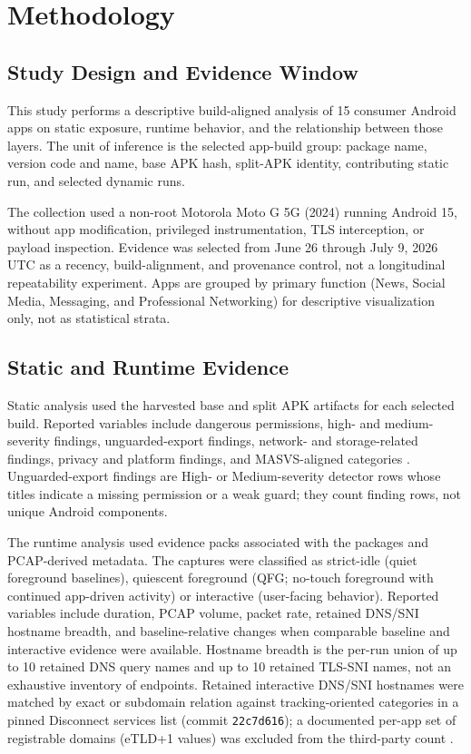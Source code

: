 \section{Methodology}

\subsection{Study Design and Evidence Window}

This study performs a descriptive build-aligned analysis of 15 consumer Android apps on static exposure, runtime behavior, and the relationship between those layers. The unit of inference is the selected app-build group: package name, version code and name, base APK hash, split-APK identity, contributing static run, and selected dynamic runs.

The collection used a non-root Motorola Moto G 5G (2024) running Android 15, without app modification, privileged instrumentation, TLS interception, or payload inspection. Evidence was selected from June 26 through July 9, 2026 UTC as a recency, build-alignment, and provenance control, not a longitudinal repeatability experiment. Apps are grouped by primary function (News, Social Media, Messaging, and Professional Networking) for descriptive visualization only, not as statistical strata.

\subsection{Static and Runtime Evidence}

Static analysis used the harvested base and split APK artifacts for each selected build. Reported variables include dangerous permissions, high- and medium-severity findings, unguarded-export findings, network- and storage-related findings, privacy and platform findings, and MASVS-aligned categories \cite{owaspMasvs2024}. Unguarded-export findings are High- or Medium-severity detector rows whose titles indicate a missing permission or a weak guard; they count finding rows, not unique Android components.

The runtime analysis used evidence packs associated with the packages and PCAP-derived metadata. The captures were classified as strict-idle (quiet foreground baselines), quiescent foreground (QFG; no-touch foreground with continued app-driven activity) or interactive (user-facing behavior). Reported variables include duration, PCAP volume, packet rate, retained DNS/SNI hostname breadth, and baseline-relative changes when comparable baseline and interactive evidence were available. Hostname breadth is the per-run union of up to 10 retained DNS query names and up to 10 retained TLS-SNI names, not an exhaustive inventory of endpoints. Retained interactive DNS/SNI hostnames were matched by exact or subdomain relation against tracking-oriented categories in a pinned Disconnect services list (commit \texttt{22c7d616}); a documented per-app set of registrable domains (eTLD+1 values) was excluded from the third-party count \cite{disconnectTrackingProtection}.

